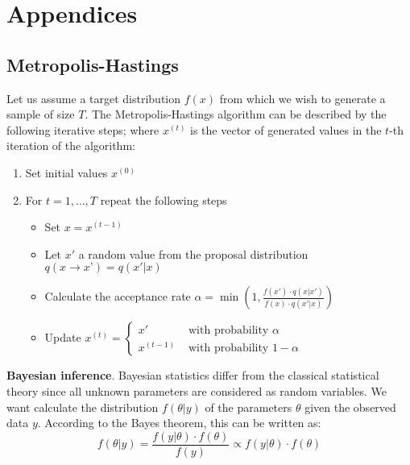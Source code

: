 \documentclass[11pt,fleqn]{book} %
\begin{document}
\chapter{Appendices}


\section{Metropolis-Hastings}

\begin{algorithm}
Let us assume a target distribution $f(x)$ from which we wish to generate a 
sample of size $T$. The Metropolis-Hastings algorithm can be described by the 
following iterative steps; where $x^{(t)}$ is the vector of generated values 
in the $t$-th iteration of the algorithm:
\begin{enumerate}
\item Set initial values $x^{(0)}$
\item For $t=1,\dots,T$ repeat the following steps
\begin{itemize}
\item Set $x=x^{(t-1)}$
\item Let $x'$ a random value from the proposal distribution $q(x \to x’)=q(x'|x)$
\item Calculate the acceptance rate 
      $\alpha = \min\left(1,\frac{f(x') \cdot q(x|x')}{f(x) \cdot q(x'|x)}\right)$
\item Update $x^{(t)}=\left\{
  \begin{array}{ll}
  x' & \textrm{ with probability } \alpha \\
  x^{(t-1)}  & \textrm{ with probability } 1-\alpha
  \end{array}\right.$ 
\end{itemize}
\end{enumerate}
\end{algorithm}



\textbf{Bayesian inference}.
Bayesian statistics differ from the classical statistical theory since all 
unknown parameters are considered as random variables.
We want calculate the distribution $f(\theta|y)$ of the parameters $\theta$ 
given the observed data $y$. According to the Bayes theorem, this can be 
written as:
\begin{displaymath}
f(\theta|y) = \frac{f(y|\theta) \cdot f(\theta)}{f(y)} \propto f(y|\theta) \cdot f(\theta)
\end{displaymath}
\end{document}
